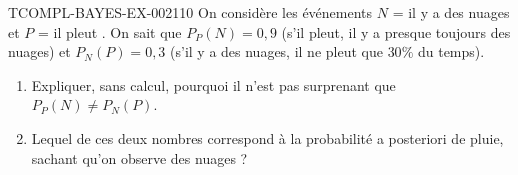 \begin{exercice}{TCOMPL-BAYES-EX-002}{1}{10}
On considère les événements $N$ = \og il y a des nuages \fg{} et $P$ = \og il pleut \fg{}. On sait que $P_P(N) = 0{,}9$ (s'il pleut, il y a presque toujours des nuages) et $P_N(P) = 0{,}3$ (s'il y a des nuages, il ne pleut que $30\%$ du temps).
\begin{enumerate}
  \item Expliquer, sans calcul, pourquoi il n'est pas surprenant que $P_P(N)
\neq P_N(P)$.
  \item Lequel de ces deux nombres correspond à la probabilité \og a posteriori \fg{} de pluie, sachant qu'on observe des nuages ?
\end{enumerate}
\end{exercice}
